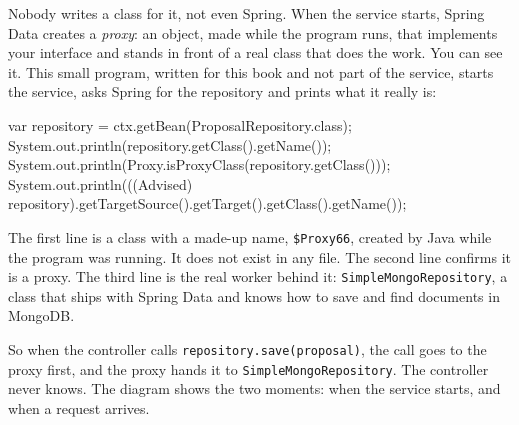 Nobody writes a class for it, not even Spring. When the service starts,
Spring Data creates a \emph{proxy}: an object, made while the program runs,
that implements your interface and stands in front of a real class that does
the work. You can see it. This small program, written for this book and not
part of the service, starts the service, asks Spring for the repository and
prints what it really is:

\begin{code}
var repository = ctx.getBean(ProposalRepository.class);
System.out.println(repository.getClass().getName());
System.out.println(Proxy.isProxyClass(repository.getClass()));
System.out.println(((Advised) repository).getTargetSource().getTarget().getClass().getName());
\end{code}


The first line is a class with a made-up name, \texttt{\$Proxy66}, created
by Java while the program was running. It does not exist in any file. The
second line confirms it is a proxy. The third line is the real worker behind
it: \texttt{SimpleMongoRepository}, a class that ships with Spring Data and
knows how to save and find documents in MongoDB.

So when the controller calls \texttt{repository.save(proposal)}, the call
goes to the proxy first, and the proxy hands it to
\texttt{SimpleMongoRepository}. The controller never knows. The diagram shows
the two moments: when the service starts, and when a request arrives.

